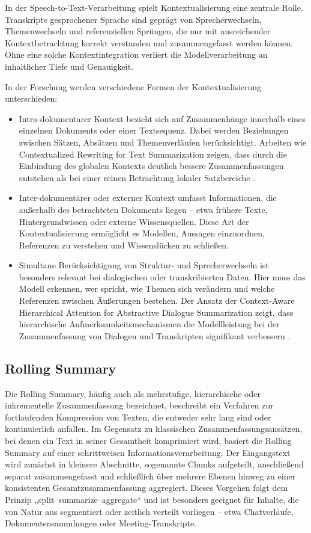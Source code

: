 In der Speech-to-Text-Verarbeitung spielt Kontextualisierung eine zentrale Rolle. Transkripte gesprochener Sprache sind geprägt von Sprecherwechseln, Themenwechseln und referenziellen Sprüngen, die nur mit ausreichender Kontextbetrachtung korrekt verstanden und zusammengefasst werden können. Ohne eine solche Kontextintegration verliert die Modellverarbeitung an inhaltlicher Tiefe und Genauigkeit.

In der Forschung werden verschiedene Formen der Kontextualisierung unterschieden:

\begin{itemize}
    \item Intra-dokumentarer Kontext bezieht sich auf Zusammenhänge innerhalb eines einzelnen Dokuments oder einer Textsequenz. Dabei werden Beziehungen zwischen Sätzen, Absätzen und Themenverläufen berücksichtigt. Arbeiten wie Contextualized Rewriting for Text Summarization zeigen, dass durch die Einbindung des globalen Kontexts deutlich bessere Zusammenfassungen entstehen als bei einer reinen Betrachtung lokaler Satzbereiche \cite{Bao2021}.
    \item Inter-dokumentärer oder externer Kontext umfasst Informationen, die außerhalb des betrachteten Dokuments liegen – etwa frühere Texte, Hintergrundwissen oder externe Wissensquellen. Diese Art der Kontextualisierung ermöglicht es Modellen, Aussagen einzuordnen, Referenzen zu verstehen und Wissenslücken zu schließen.
    \item Simultane Berücksichtigung von Struktur- und Sprecherwechseln ist besonders relevant bei dialogischen oder transkribierten Daten. Hier muss das Modell erkennen, wer spricht, wie Themen sich verändern und welche Referenzen zwischen Äußerungen bestehen. Der Ansatz der Context-Aware Hierarchical Attention for Abstractive Dialogue Summarization zeigt, dass hierarchische Aufmerksamkeitsmechanismen die Modellleistung bei der Zusammenfassung von Dialogen und Transkripten signifikant verbessern \cite{Yang2025}.
\end{itemize}

\subsection{Rolling Summary}
Die Rolling Summary, häufig auch als mehrstufige, hierarchische oder inkrementelle Zusammenfassung bezeichnet, beschreibt ein Verfahren zur fortlaufenden Kompression von Texten, die entweder sehr lang sind oder kontinuierlich anfallen. Im Gegensatz zu klassischen Zusammenfassungsansätzen, bei denen ein Text in seiner Gesamtheit komprimiert wird, basiert die Rolling Summary auf einer schrittweisen Informationsverarbeitung. Der Eingangstext wird zunächst in kleinere Abschnitte, sogenannte Chunks aufgeteilt, anschließend separat zusammengefasst und schließlich über mehrere Ebenen hinweg zu einer konsistenten Gesamtzusammenfassung aggregiert. Dieses Vorgehen folgt dem Prinzip „split–summarize–aggregate“ und ist besonders geeignet für Inhalte, die von Natur aus segmentiert oder zeitlich verteilt vorliegen – etwa Chatverläufe, Dokumentensammlungen oder Meeting-Transkripte.

